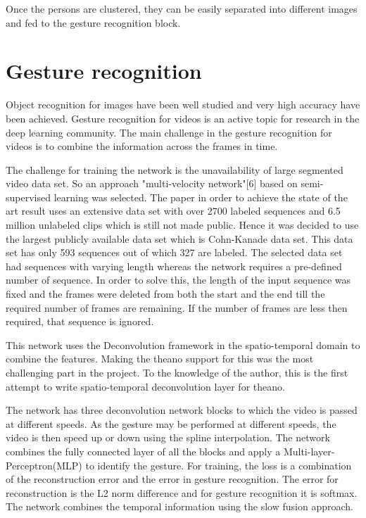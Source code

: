 \documentclass[a4paper]{article}
\begin{document}
Once the persons are clustered, they can be easily separated into different images and fed to the gesture recognition block. 


\section{Gesture recognition}
	
Object recognition for images have been well studied and very high accuracy have been achieved. Gesture recognition for videos is an active topic for research in the deep learning community. The main challenge in the gesture recognition for videos is to combine the information across the frames in time.

The challenge for training the network is the unavailability of large segmented video data set. So an approach "multi-velocity network"[6] based on semi-supervised learning was selected. The paper in order to achieve the state of the art result uses an extensive data set with over 2700 labeled sequences and 6.5 million unlabeled clips which is still not made public. Hence it was decided to use the largest publicly available data set which is Cohn-Kanade data set. This data set has only 593 sequences out of which 327 are labeled. The selected data set had sequences with varying length whereas the network requires a pre-defined number of sequence. In order to solve this, the length of the input sequence was fixed and the frames were deleted from both the start and the end till the required number of frames are remaining. If the number of frames are less then required, that sequence is ignored.

This network uses the Deconvolution framework in the spatio-temporal domain to combine the features. Making the theano support for this was the most challenging part in the project. To the knowledge of the author, this is the first attempt to write spatio-temporal deconvolution layer for theano.

The network has three deconvolution network blocks to which the video is passed at different speeds. As the gesture may be performed at different speeds, the video is then speed up or down using the spline interpolation. The network combines the fully connected layer of all the blocks and apply a Multi-layer-Perceptron(MLP) to identify the gesture. For training, the loss is a combination of the reconstruction error and the error in gesture recognition. The error for reconstruction is the L2 norm difference and for gesture recognition it is softmax. The network combines the temporal information using the slow fusion approach.
\end{document}
